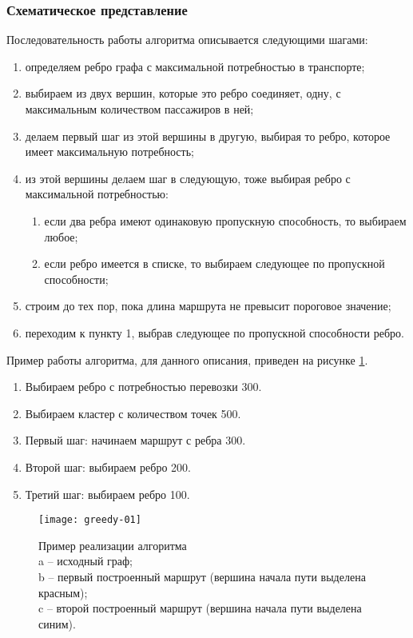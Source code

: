 \subsubsection{Схематическое представление}
Последовательность работы алгоритма описывается следующими шагами:
\begin{enumerate}
    \item определяем ребро графа с максимальной потребностью в транспорте;
    \item выбираем из двух вершин, которые это ребро соединяет, одну, с максимальным количеством 
        пассажиров в ней;
    \item делаем первый шаг из этой вершины в другую, выбирая то ребро, которое имеет максимальную 
        потребность;
    \item из этой вершины делаем шаг в следующую, тоже выбирая ребро с максимальной потребностью:
    \begin{enumerate}
        \item если два ребра имеют одинаковую пропускную способность, то выбираем любое;
        \item если ребро имеется в списке, то выбираем следующее по пропускной способности;
    \end{enumerate}
    \item строим до тех пор, пока длина маршрута не превысит пороговое значение;
    \item переходим к пункту 1, выбрав следующее по пропускной способности ребро.
\end{enumerate}

Пример работы алгоритма, для данного описания, приведен на рисунке \ref{img:greedy-01}.
\begin{enumerate}
    \item Выбираем ребро с потребностью перевозки 300.
    \item Выбираем кластер с количеством точек 500.
    \item Первый шаг: начинаем маршрут с ребра 300.
    \item Второй шаг: выбираем ребро 200.
    \item Третий шаг: выбираем ребро 100.
\end{enumerate}

\begin{figure}[h!]
    \centering
    \texttt{[image: greedy-01]}
    \caption{Пример реализации алгоритма\\
        a -- исходный граф;\\
        b -- первый построенный маршрут (вершина начала пути выделена красным);\\
        c -- второй построенный маршрут (вершина начала пути выделена синим).
    }
   \label{img:greedy-01}
\end{figure}


